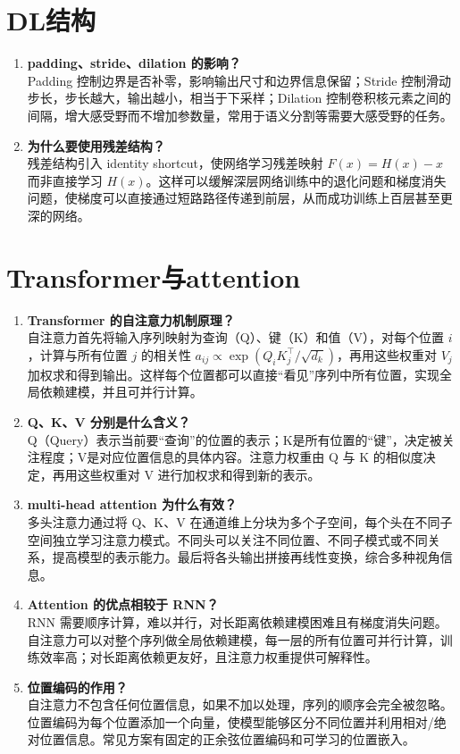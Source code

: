 \documentclass{article}
\begin{document}
\section{DL结构}
\begin{enumerate}
\item \textbf{padding、stride、dilation 的影响？}\\
Padding 控制边界是否补零，影响输出尺寸和边界信息保留；Stride 控制滑动步长，步长越大，输出越小，相当于下采样；Dilation 控制卷积核元素之间的间隔，增大感受野而不增加参数量，常用于语义分割等需要大感受野的任务。

\item \textbf{为什么要使用残差结构？}\\
残差结构引入 identity shortcut，使网络学习残差映射 $F(x)=H(x)-x$ 而非直接学习 $H(x)$。这样可以缓解深层网络训练中的退化问题和梯度消失问题，使梯度可以直接通过短路路径传递到前层，从而成功训练上百层甚至更深的网络。
\end{enumerate}

\section{Transformer与attention}
\begin{enumerate}
\item \textbf{Transformer 的自注意力机制原理？}\\
自注意力首先将输入序列映射为查询（Q）、键（K）和值（V），对每个位置 $i$，计算与所有位置 $j$ 的相关性 $a_{ij} \propto \exp(Q_i K_j^\top / \sqrt{d_k})$，再用这些权重对 $V_j$ 加权求和得到输出。这样每个位置都可以直接“看见”序列中所有位置，实现全局依赖建模，并且可并行计算。

\item \textbf{Q、K、V 分别是什么含义？}\\
Q（Query）表示当前要“查询”的位置的表示；K是所有位置的“键”，决定被关注程度；V是对应位置信息的具体内容。注意力权重由 Q 与 K 的相似度决定，再用这些权重对 V 进行加权求和得到新的表示。

\item \textbf{multi-head attention 为什么有效？}\\
多头注意力通过将 Q、K、V 在通道维上分块为多个子空间，每个头在不同子空间独立学习注意力模式。不同头可以关注不同位置、不同子模式或不同关系，提高模型的表示能力。最后将各头输出拼接再线性变换，综合多种视角信息。

\item \textbf{Attention 的优点相较于 RNN？}\\
RNN 需要顺序计算，难以并行，对长距离依赖建模困难且有梯度消失问题。自注意力可以对整个序列做全局依赖建模，每一层的所有位置可并行计算，训练效率高；对长距离依赖更友好，且注意力权重提供可解释性。

\item \textbf{位置编码的作用？}\\
自注意力不包含任何位置信息，如果不加以处理，序列的顺序会完全被忽略。位置编码为每个位置添加一个向量，使模型能够区分不同位置并利用相对/绝对位置信息。常见方案有固定的正余弦位置编码和可学习的位置嵌入。
\end{enumerate}
\end{document}
